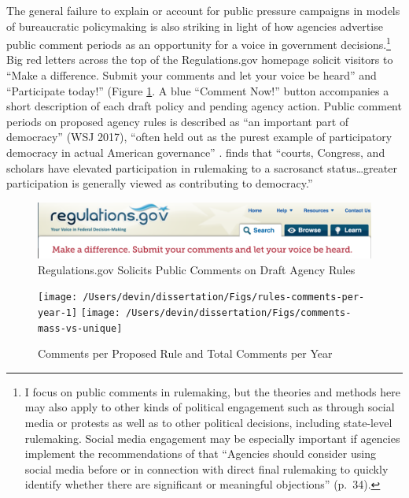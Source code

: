 \documentclass[
      12pt,
        ]{article}
\begin{document}
The general failure to explain or account for public pressure campaigns in models of bureaucratic policymaking is also striking in light of how agencies advertise public
comment periods as an opportunity for a voice in government
decisions.\footnote{I focus on public comments in rulemaking, but the theories and
  methods here may also apply to other kinds of political engagement
  such as through social media or protests as well as to other
  political decisions, including state-level rulemaking. Social media
  engagement may be especially important if agencies implement the
  recommendations of \citet{ACUS2018} that ``Agencies should consider using
  social media before or in connection with direct final rulemaking to
  quickly identify whether there are significant or meaningful
  objections'' (p.~34).} Big red letters across the top of the Regulations.gov
homepage solicit visitors to ``Make a difference. Submit your comments
and let your voice be heard'' and ``Participate today!'' (Figure \ref{fig:regsgov}. A blue ``Comment Now!'' button accompanies a short description of each draft
policy and pending agency action.
Public comment periods on proposed agency
rules is described as ``an important part of democracy'' (WSJ 2017),
``often held out as the purest example of participatory democracy in
actual American governance'' \citep{Herz2016}. \citet{Rossi1997} finds that ``courts, Congress, and scholars have elevated participation in rulemaking to
a sacrosanct status\ldots greater participation is generally viewed as
contributing to democracy.''

\begin{figure}

{\centering \includegraphics[width=6.5in]{../Figs/regulations-header} 

}

\caption{Regulations.gov Solicits Public Comments on Draft Agency Rules}\label{fig:regsgov}
\end{figure}

\begin{figure}

{\centering \texttt{[image: /Users/devin/dissertation/Figs/rules-comments-per-year-1]} \texttt{[image: /Users/devin/dissertation/Figs/comments-mass-vs-unique]} 

}

\caption{Comments per Proposed Rule and Total Comments per Year}\label{fig:comments-per-year}
\end{figure}
\end{document}
